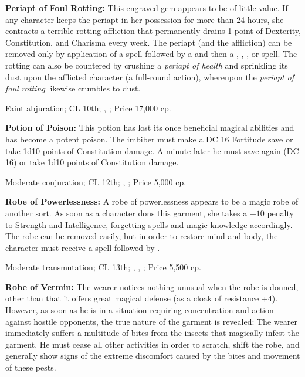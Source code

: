 \textbf{Periapt of Foul Rotting:} This engraved gem appears to be of little value. If any character keeps the periapt in her possession for more than 24 hours, she contracts a terrible rotting affliction that permanently drains 1 point of Dexterity, Constitution, and Charisma every week. The periapt (and the affliction) can be removed only by application of a  spell followed by a  and then a , , , or  spell. The rotting can also be countered by crushing a \emph{periapt of health} and sprinkling its dust upon the afflicted character (a full-round action), whereupon the \emph{periapt of foul rotting} likewise crumbles to dust.

Faint abjuration; CL 10th; , ; Price 17,000 cp.

\textbf{Potion of Poison:} This potion has lost its once beneficial magical abilities and has become a potent poison. The imbiber must make a DC 16 Fortitude save or take 1d10 points of Constitution damage. A minute later he must save again (DC 16) or take 1d10 points of Constitution damage.

Moderate conjuration; CL 12th; , ; Price 5,000 cp.

\textbf{Robe of Powerlessness:} A robe of powerlessness appears to be a magic robe of another sort. As soon as a character dons this garment, she takes a $-10$ penalty to Strength and Intelligence, forgetting spells and magic knowledge accordingly. The robe can be removed easily, but in order to restore mind and body, the character must receive a  spell followed by .

Moderate transmutation; CL 13th; , , ; Price 5,500 cp.

\textbf{Robe of Vermin:} The wearer notices nothing unusual when the robe is donned, other than that it offers great magical defense (as a cloak of resistance +4). However, as soon as he is in a situation requiring concentration and action against hostile opponents, the true nature of the garment is revealed: The wearer immediately suffers a multitude of bites from the insects that magically infest the garment. He must cease all other activities in order to scratch, shift the robe, and generally show signs of the extreme discomfort caused by the bites and movement of these pests.

